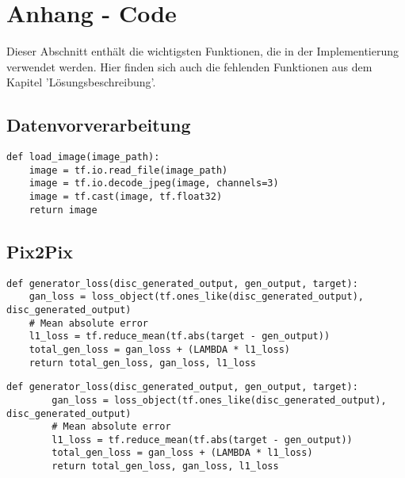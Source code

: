 \chapter{Anhang - Code}

Dieser Abschnitt enthält die wichtigsten Funktionen, die in der Implementierung verwendet werden. 
Hier finden sich auch die fehlenden Funktionen aus dem Kapitel 'Lösungsbeschreibung'.

\section*{Datenvorverarbeitung}
\begin{lstlisting}[language=pyhaff, caption={Lesen eines Bildes (CycleGAN Implementierung)}, label={cod:imageLoading}]
def load_image(image_path):
    image = tf.io.read_file(image_path)
    image = tf.io.decode_jpeg(image, channels=3)
    image = tf.cast(image, tf.float32)
    return image
\end{lstlisting}

\newpage

\section*{Pix2Pix}
\begin{lstlisting}[language=pyhaff, caption={Pix2Pix Generatorverlust}, label={cod:pix2pixGenLoss}]
def generator_loss(disc_generated_output, gen_output, target):
    gan_loss = loss_object(tf.ones_like(disc_generated_output), disc_generated_output)  
    # Mean absolute error
    l1_loss = tf.reduce_mean(tf.abs(target - gen_output))
    total_gen_loss = gan_loss + (LAMBDA * l1_loss)
    return total_gen_loss, gan_loss, l1_loss  
\end{lstlisting}

\begin{lstlisting}[language=pyhaff, caption={Residualblock Implementierung}, label={cod:residual}]
    def generator_loss(disc_generated_output, gen_output, target):
        gan_loss = loss_object(tf.ones_like(disc_generated_output), disc_generated_output)  
        # Mean absolute error
        l1_loss = tf.reduce_mean(tf.abs(target - gen_output))
        total_gen_loss = gan_loss + (LAMBDA * l1_loss)
        return total_gen_loss, gan_loss, l1_loss  
\end{lstlisting}

\newpage


